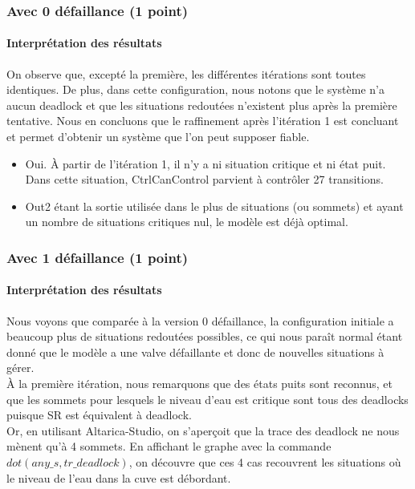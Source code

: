 \documentclass[a4paper]{book}
\begin{document}
\subsubsection{Avec 0 défaillance (1 point)}





\paragraph{Interprétation des résultats}

On observe que, excepté la première, les différentes itérations sont toutes identiques. De plus, dans cette configuration, nous notons que le système n'a aucun deadlock et que les situations redoutées n'existent plus après la première tentative. Nous en concluons que le raffinement après l'itération 1 est concluant et permet d'obtenir un système que l'on peut supposer fiable.

\begin{itemize}
	\item Oui. À partir de l'itération 1, il n'y a ni situation critique et ni état puit. Dans cette situation, CtrlCanControl parvient à contrôler 27 transitions.
	\item Out2 étant la sortie utilisée dans le plus de situations (ou sommets) et ayant un nombre de situations critiques nul, le modèle est déjà optimal.
\end{itemize}

\subsubsection{Avec 1 défaillance (1 point)}





\paragraph{Interprétation des résultats}

Nous voyons que comparée à la version 0 défaillance, la configuration initiale a beaucoup plus de situations redoutées possibles, ce qui nous paraît normal étant donné que le modèle a une valve défaillante et donc de nouvelles situations à gérer. \\
À la première itération, nous remarquons que des états puits sont reconnus, et que les sommets pour lesquels le niveau d'eau est critique sont tous des deadlocks puisque SR est équivalent à deadlock. \\ 
Or, en utilisant Altarica-Studio, on s'aperçoit que la trace des deadlock ne nous mènent qu'à 4 sommets. En affichant le graphe avec la commande $dot(any\_s, tr\_deadlock)$, on découvre que ces 4 cas recouvrent les situations où le niveau de l'eau dans la cuve est débordant.
\end{document}
